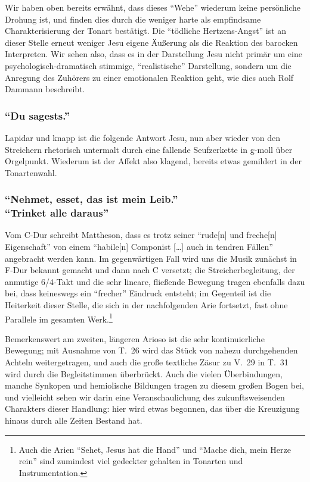 \documentclass[a4paper,11pt,twoside]{scrartcl}
\begin{document}
Wir haben oben bereits erwähnt, dass dieses \enquote{Wehe} wiederum
keine persönliche Drohung ist, und finden dies durch die weniger
harte als empfindsame Charakterisierung der Tonart bestätigt.  Die
\enquote{tödliche Hertzens-Angst} ist an dieser Stelle erneut weniger
Jesu eigene Äußerung als die Reaktion des barocken Interpreten.  Wir
sehen also, dass es in der Darstellung Jesu nicht primär um eine
psy\-cho\-lo\-gisch-dra\-ma\-tisch stimmige, \enquote{realistische}
Darstellung, sondern um die Anregung des Zuhörers zu einer emotionalen
Reaktion geht, wie dies auch Rolf Dammann beschreibt\cite[S.~224\,ff.]{dammann}.

\subsubsection*{\enquote{Du sagests.}}
Lapidar und knapp ist die folgende Antwort Jesu, nun aber wieder von
den Streichern rhetorisch untermalt durch eine fallende Seufzerkette
in g-moll über Orgelpunkt.  Wiederum ist der Affekt also klagend,
bereits etwas gemildert in der Tonartenwahl.

\subsubsection*{
\enquote{Nehmet, esset, das ist mein Leib.} \\
\enquote{Trinket alle daraus}
}
Vom C-Dur schreibt Mattheson, dass es trotz seiner \enquote{rude[n]
und freche[n] Eigenschaft} von einem \enquote{habile[n] Componist […]
auch in tendren Fällen} angebracht werden kann.  Im gegenwärtigen Fall
wird uns die Musik zunächst in F-Dur bekannt gemacht und dann nach C
versetzt; die Streicherbegleitung, der anmutige 6/4-Takt und die sehr
lineare, fließende Bewegung tragen ebenfalls dazu bei, dass keineswegs
ein \enquote{frecher} Eindruck entsteht; im Gegenteil ist die Heiterkeit
dieser Stelle, die sich in der nachfolgenden Arie fortsetzt, fast ohne
Parallele im gesamten Werk.\footnote{Auch die Arien \enquote{Sehet,
Jesus hat die Hand} und \enquote{Mache dich, mein Herze rein} sind
zumindest viel gedeckter gehalten in Tonarten und Instrumentation.}

Bemerkenswert am zweiten, längeren Arioso ist die sehr kontinuierliche
Bewegung; mit Ausnahme von T.~26 wird das Stück von nahezu durchgehenden
Achteln weitergetragen, und auch die große textliche Zäsur zu V.~29
in T.~31 wird durch die Begleitstimmen überbrückt.  Auch die vielen
Überbindungen, manche Synkopen und hemiolische Bildungen tragen zu
diesem großen Bogen bei, und vielleicht sehen wir darin eine
Veranschaulichung des zukunftsweisenden Charakters dieser Handlung:
hier wird etwas begonnen, das über die Kreuzigung hinaus durch alle
Zeiten Bestand hat.
\end{document}
